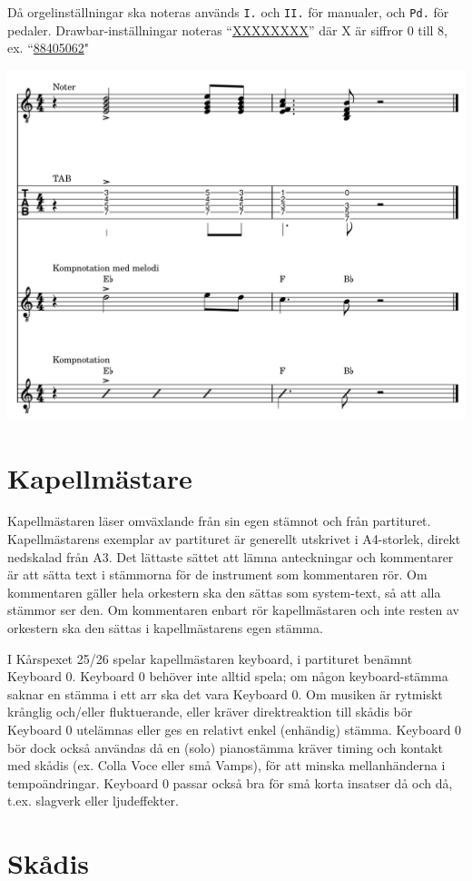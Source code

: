Då orgelinställningar ska noteras används \verb|I.| och \verb|II.| för manualer, och \verb|Pd.| för pedaler. Drawbar-inställningar noteras ``\underline{XXXXXXXX}'' där X är siffror 0 till 8, ex. ``\underline{88405062}"

\begin{center}
    \includegraphics[width=\textwidth]{lilypond/kompnotation.cropped.png}
\end{center}

\section{Kapellmästare}
Kapellmästaren läser omväxlande från sin egen stämnot och från partituret. Kapellmästarens exemplar av partituret är generellt utskrivet i A4-storlek, direkt nedskalad från A3. Det lättaste sättet att lämna anteckningar och kommentarer är att sätta text i stämmorna för de instrument som kommentaren rör. Om kommentaren gäller hela orkestern ska den sättas som system-text, så att alla stämmor ser den. Om kommentaren enbart rör kapellmästaren och inte resten av orkestern ska den sättas i kapellmästarens egen stämma. 

I Kårspexet 25/26 spelar kapellmästaren keyboard, i partituret benämnt Keyboard 0. Keyboard 0 behöver inte alltid spela; om någon keyboard-stämma saknar en stämma i ett arr ska det vara Keyboard 0. Om musiken är rytmiskt krånglig och/eller fluktuerande, eller kräver direktreaktion till skådis bör Keyboard 0 utelämnas eller ges en relativt enkel (enhändig) stämma. Keyboard 0 bör dock också användas då en (solo) pianostämma kräver timing och kontakt med skådis (ex. Colla Voce eller små Vamps), för att minska mellanhänderna i tempoändringar. Keyboard 0 passar också bra för små korta insatser då och då, t.ex. slagverk eller ljudeffekter.
\section{Skådis}
